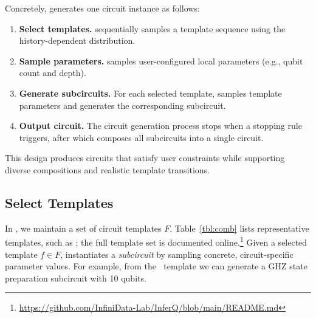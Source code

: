 Concretely, \sys generates one circuit instance as follows:
\begin{enumerate}
    \item \textbf{Select templates.} 
    \sys sequentially samples a template sequence using the
    history-dependent distribution.
     \item \textbf{Sample parameters.}   \sys  samples user-configured  local parameters
    (e.g., qubit count and depth).
    \item \textbf{Generate  subcircuits.} For each selected template, \sys samples template
    parameters and generates the corresponding subcircuit.
    \item \textbf{Output circuit.} The circuit generation process stops when a stopping rule triggers, after which \sys composes
    all subcircuits into a single circuit.
\end{enumerate}

This design produces circuits that satisfy user constraints while supporting diverse
compositions and realistic template transitions.

\subsection{Select Templates}
\label{sssec:seq_select}
In \sys, we maintain a set of circuit templates \(F\).
Table~\ref{tbl:comb} lists representative templates, such as \famStatePrep; the full
template set is documented online.\footnote{\url{https://github.com/InfiniData-Lab/InferQ/blob/main/README.md}}
Given a selected template \(f\in F\), \sys instantiates a \emph{subcircuit} by sampling
concrete, circuit-specific parameter values. For example, from the  \famStatePrep $\ $ template we can
generate a GHZ state preparation subcircuit with 10 qubits.

